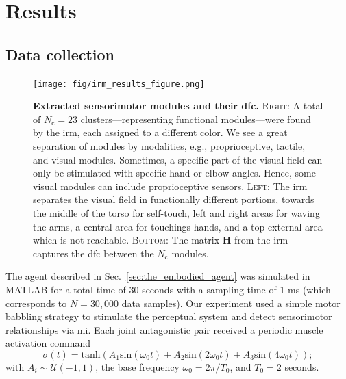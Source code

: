 \section{Results}

\subsection{Data collection}
\begin{figure}[t!]
    \centering
    \texttt{[image: fig/irm\_results\_figure.png]}
    \vspace{5pt}
    \caption{\textbf{Extracted sensorimotor modules and their \ac{dfc}.} \textsc{Right}: A total of $N_\text{c}=23$ clusters---representing functional modules---were found by the \ac{irm}, each assigned to a different color. We see a great separation of modules by modalities, e.g., proprioceptive, tactile, and visual modules. Sometimes, a specific part of the visual field can only be stimulated with specific hand or elbow angles. Hence, some visual modules can include proprioceptive sensors. \textsc{Left}: The \ac{irm} separates the visual field in functionally different portions, towards the middle of the torso for self-touch, left and right areas for waving the arms, a central area for touchings hands, and a top external area which is not reachable. \textsc{Bottom}: The matrix $\bm{H}$ from the \ac{irm} captures the \ac{dfc} between the $N_\text{c}$ modules.}
    \label{fig:irm_modules}
    \vspace{-15pt}
\end{figure}

The agent described in Sec.~\ref{sec:the_embodied_agent} was simulated in MATLAB for a total time of 30 seconds with a sampling time of 1 ms (which corresponds to $N = 30,000$ data samples). Our experiment used a simple motor babbling strategy to stimulate the perceptual system and detect sensorimotor relationships via \ac{mi}. Each joint antagonistic pair received a periodic muscle activation command
\begin{equation}\label{eq:motor_babbling_torques}
	\sigma(t) =  \text{tanh} \left( A_1 \text{sin}\left(\omega_0 t\right) + A_2 \text{sin}\left(2\omega_0 t\right) + A_3 \text{sin}\left(4\omega_0 t\right) \right);
\end{equation}	
with $A_i \sim \mathcal{U}(-1,1)$, the base frequency $\omega_0 = 2\pi/T_0$, and $T_0=2$ seconds.

